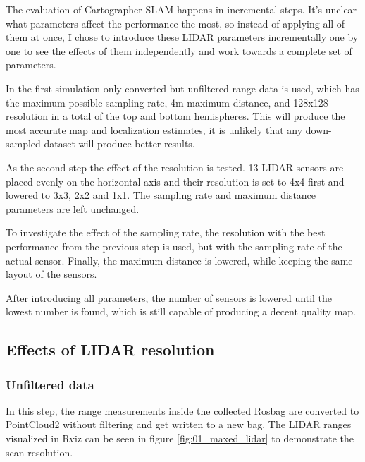 The evaluation of Cartographer SLAM happens in incremental steps. It's unclear what parameters
affect the performance the most, so instead of applying all of them at once, I chose to introduce
these LIDAR parameters incrementally one by one to see the effects of them independently
and work towards a complete set of parameters.

In the first simulation only converted but unfiltered range data is used, which has the
maximum possible sampling rate, 4m maximum distance, and 128x128-resolution in a total of
the top and bottom hemispheres. This will produce the most accurate map and localization
estimates, it is unlikely that any down-sampled dataset will produce better results.

As the second step the effect of the resolution is tested. 13 LIDAR sensors are placed
evenly on the horizontal axis and their resolution is set to 4x4 first and lowered to 3x3,
2x2 and 1x1. The sampling rate and maximum distance parameters are left unchanged.

To investigate the effect of the sampling rate, the resolution with the best performance
from the previous step is used, but with the sampling rate of the actual sensor. Finally,
the maximum distance is lowered, while keeping the same layout of the sensors.

After introducing all parameters, the number of sensors is lowered until the lowest number
is found, which is still capable of producing a decent quality map.







\newpage



\subsection{Effects of LIDAR resolution}
\subsubsection{Unfiltered data}
In this step, the range measurements inside the collected Rosbag are converted to PointCloud2
without filtering and get written to a new bag. The LIDAR ranges visualized in
Rviz can be seen in figure \ref{fig:01_maxed_lidar} to demonstrate the scan resolution.

